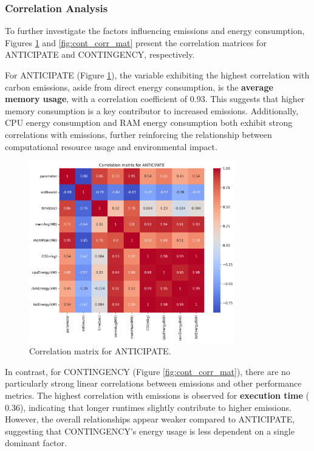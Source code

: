 \documentclass[a4paper,singleside,12pt]{report} %
\begin{document}
\subsubsection{Correlation Analysis}

To further investigate the factors influencing emissions and energy consumption, Figures \ref{fig:ant_corr_mat} and \ref{fig:cont_corr_mat} present the correlation matrices for ANTICIPATE and 
CONTINGENCY, respectively.

For ANTICIPATE (Figure \ref{fig:ant_corr_mat}), the variable exhibiting the highest correlation with carbon emissions, aside from direct energy consumption, is the \textbf{average memory usage}, 
with a correlation coefficient of $0.93$. This suggests that higher memory consumption is a key contributor to increased emissions. Additionally, CPU energy consumption and RAM energy consumption 
both exhibit strong correlations with emissions, further reinforcing the relationship between computational resource usage and environmental impact.

\begin{figure}[h!]
    \centering
    \includegraphics[width=0.8\textwidth]{imgs/ant_corr_mat.png}
    \caption{Correlation matrix for ANTICIPATE.}
    \label{fig:ant_corr_mat}
\end{figure}

In contrast, for CONTINGENCY (Figure \ref{fig:cont_corr_mat}), there are no particularly strong linear correlations between emissions and other performance metrics. The highest correlation with 
emissions is observed for \textbf{execution time} ($0.36$), indicating that longer runtimes slightly contribute to higher emissions. However, the overall relationships appear weaker compared 
to ANTICIPATE, suggesting that CONTINGENCY’s energy usage is less dependent on a single dominant factor.
\end{document}

